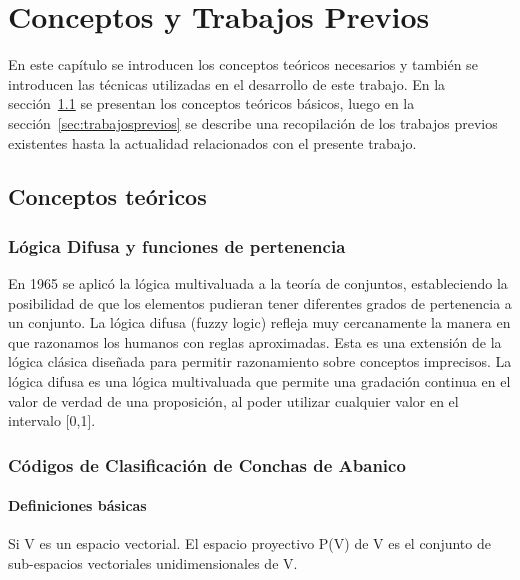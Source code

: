 \chapter{Conceptos y Trabajos Previos}
\label{cap:conceptosprevios}
En este capítulo se introducen los conceptos teóricos necesarios y también se introducen las técnicas utilizadas 
en el desarrollo de este trabajo. En la sección~\ref{sec:conceptos} se presentan los conceptos teóricos 
básicos, luego en la sección~\ref{sec:trabajosprevios} se describe una recopilación de los trabajos previos
existentes hasta la actualidad relacionados con el presente trabajo.

\section{Conceptos teóricos}
\label{sec:conceptos}

\subsection{Lógica Difusa y funciones de pertenencia} 
En 1965 \cite{cit:zadeh} se aplicó la lógica multivaluada a la teoría de conjuntos, estableciendo la posibilidad de que los elementos pudieran tener diferentes grados de pertenencia a un conjunto.
La lógica difusa (fuzzy logic) refleja muy cercanamente la manera en que razonamos los humanos con reglas aproximadas. Esta es una extensión de la lógica clásica diseñada para permitir  razonamiento sobre conceptos imprecisos. La lógica difusa es una lógica multivaluada que permite una gradación continua en el valor de verdad de una proposición, al poder utilizar cualquier valor en el intervalo [0,1].




\subsection{Códigos de Clasificación de Conchas de Abanico} 
\label{sec:codigos}

\subsubsection{Definiciones básicas}
\begin{definicion}
Si {V} es un espacio vectorial. El espacio proyectivo {P(V)} de {V} es el conjunto de sub-espacios vectoriales 
unidimensionales de {V}.
\end{definicion}

